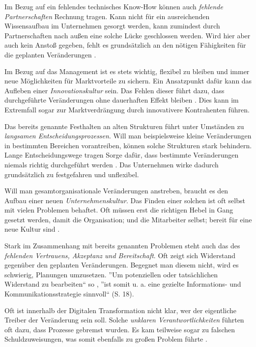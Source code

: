 Im Bezug auf ein fehlendes technisches Know-How können auch \textit{fehlende Partnerschaften} Rechnung tragen. Kann nicht für ein ausreichenden Wissensaufbau im Unternehmen gesorgt werden, kann zumindest durch Partnerschaften nach außen eine solche Lücke geschlossen werden. Wird hier aber auch kein Anstoß gegeben, fehlt es grundsätzlich an den nötigen Fähigkeiten für die geplanten Veränderungen \cite[S. 9]{nowik_promoting_2018}.

Im Bezug auf das Management ist es stets wichtig, flexibel zu bleiben und immer neue Möglichkeiten für Marktvorteile zu sichern. Ein Ansatzpunkt dafür kann das Aufleben einer \textit{Innovationskultur} sein. Das Fehlen dieser führt dazu, dass durchgeführte Veränderungen ohne dauerhaften Effekt bleiben \cite[S. 25]{weber_digital_2015}. Dies kann im Extremfall sogar zur Marktverdrängung durch innovativere Kontrahenten führen.

Das bereits genannte Festhalten an alten Strukturen führt unter Umständen zu \textit{langsamen Entscheidungsprozessen}. Will man beispielsweise kleine Veränderungen in bestimmten Bereichen vorantreiben, können solche Strukturen stark behindern. Lange Entscheidungswege tragen Sorge dafür, dass bestimmte Veränderungen niemals richtig durchgeführt werden \cite[S. 12]{depiereux_studie_2018}. Das Unternehmen wirke dadurch grundsätzlich zu festgefahren und unflexibel.

Will man gesamtorganisationale Veränderungen anstreben, braucht es den Aufbau einer neuen \textit{Unternehmenskultur}. Das Finden einer solchen ist oft selbst mit vielen Problemen behaftet. Oft müssen erst die richtigen Hebel in Gang gesetzt werden, damit die Organisation; und die Mitarbeiter selbst; bereit für eine neue Kultur sind \cite[S. 30]{kremins_2018_2018}.

Stark im Zusammenhang mit bereits genannten Problemen steht auch das des \textit{fehlenden Vertrauens, Akzeptanz und Bereitschaft}. Oft zeigt sich Widerstand gegenüber den geplanten Veränderungen. Begegnet man diesem nicht, wird es schwierig, Planungen umzusetzen.  ''Um potenziellen oder tatsächlichen Widerstand zu bearbeiten`` so ,  ''ist somit u. a. eine gezielte Informations- und Kommunikationsstrategie sinnvoll`` (S. 18).

Oft ist innerhalb der Digitalen Transformation nicht klar, wer der eigentliche  Treiber der Veränderung sein soll. Solche \textit{unklaren Verantwortlichkeiten} führten oft dazu, dass Prozesse gebremst wurden. Es kam teilweise sogar zu falschen Schuldzuweisungen, was somit ebenfalls zu großen Problem führte \cite[S. 24]{buhse_transformationswerk_2016}.

